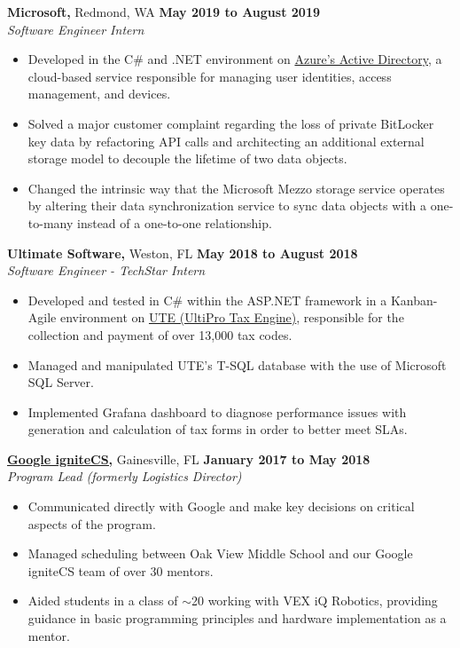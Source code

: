 \documentclass[11pt]{article} %
\begin{document}
		\noindent \textbf{Microsoft,} Redmond, WA \hfill\textbf{May 2019 to August 2019}\\
		\textit{Software Engineer Intern}
		\begin{itemize}[noitemsep,nolistsep, label = {-}]
			\item Developed in the C\# and .NET environment on \href{https://docs.microsoft.com/en-us/azure/active-directory/fundamentals/active-directory-whatis}{Azure's Active Directory}, a cloud-based service responsible for managing user identities, access management, and devices.
			\item Solved a major customer complaint regarding the loss of private BitLocker key data by refactoring API calls and architecting an additional external storage model to decouple the lifetime of two data objects.
			\item Changed the intrinsic way that the Microsoft Mezzo storage service operates by altering their data synchronization service to sync data objects with a one-to-many instead of a one-to-one relationship.
		\end{itemize}
	
		\vspace{.20cm}
		
		\noindent \textbf{Ultimate Software,} Weston, FL \hfill\textbf{May 2018 to August 2018}\\
		\textit{Software Engineer - TechStar Intern}
		\begin{itemize}[noitemsep,nolistsep, label = {-}]
			\item Developed and tested in C\# within the ASP.NET framework in a Kanban-Agile environment on \href{https://www.ultimatesoftware.com/UltiPro-Solution-Features-Payment-Services}{UTE (UltiPro Tax Engine)}, responsible for the collection and payment of over 13,000 tax codes.
			\item Managed and manipulated UTE's T-SQL database with the use of Microsoft SQL Server.
			\item Implemented Grafana dashboard to diagnose performance issues with generation and calculation of tax forms in order to better meet SLAs.
		\end{itemize}
		\vspace{.20cm}
		
		\noindent \href{https://sites.google.com/view/ignitecs/home}{\textbf{Google igniteCS,}} Gainesville, FL \hfill\textbf{January 2017 to May 2018}\\
		\textit{Program Lead (formerly Logistics Director)}
		\begin{itemize}[noitemsep,nolistsep, label = {-}]
			\item Communicated directly with Google and make key decisions on critical aspects of the program.
			\item Managed scheduling between Oak View Middle School and our Google igniteCS team of over 30 mentors.
			\item Aided students in a class of $\sim$20 working with VEX iQ Robotics, providing guidance in basic programming principles and hardware implementation as a mentor.
		\end{itemize} 
		\vspace{.20cm}
		
\end{document}

